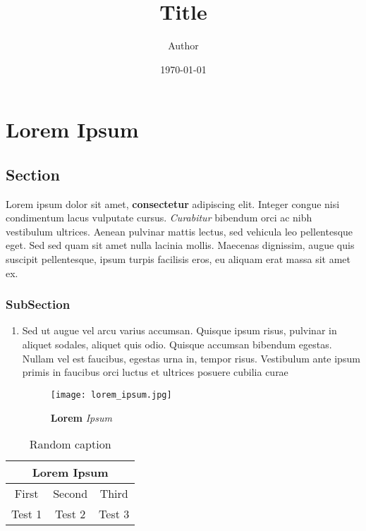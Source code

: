 \documentclass[12pt]{report}
\title{Title}
\author{Author}
\date{\today}
\begin{document}
	\maketitle
	\tableofcontents
	\chapter{Lorem Ipsum}

		\section{Section}

			Lorem ipsum dolor sit amet, \textbf{consectetur} adipiscing elit. Integer congue nisi condimentum lacus vulputate cursus. \textit{Curabitur} bibendum orci ac nibh vestibulum ultrices. Aenean pulvinar mattis lectus, sed vehicula leo pellentesque eget. Sed sed quam sit amet nulla lacinia mollis. Maecenas dignissim, augue quis suscipit pellentesque, ipsum turpis facilisis eros, eu aliquam erat massa sit amet ex.

			\subsection*{SubSection}

				\begin{enumerate}

					\item
					Sed ut augue vel arcu varius accumsan. Quisque ipsum risus, pulvinar in aliquet sodales, aliquet quis odio. Quisque accumsan bibendum egestas. Nullam vel est faucibus, egestas urna in, tempor risus. Vestibulum ante ipsum primis in faucibus orci luctus et ultrices posuere cubilia curae

					\begin{figure}[H]
						\centering
						\texttt{[image: lorem\_ipsum.jpg]}
						\caption{\textbf{Lorem} \textit{Ipsum}}
					\end{figure}

				\end{enumerate}

			\begin{table}[H]
				\centering
				\begin{tabular}{|c|c|c|}
					\hline
					\multicolumn{3}{|c|}{\textbf{Lorem Ipsum}} \\
					\hline
					First & Second & Third \\
					\hline
					Test 1 & Test 2 & Test 3 \\
					\hline
				\end{tabular}
				\caption{Random caption}
			\end{table}
\end{document}
